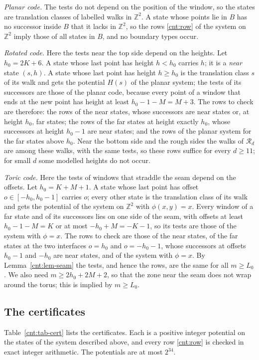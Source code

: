 \documentclass[11pt]{amsart}
\theoremstyle{definition}
\theoremstyle{remark}
\numberwithin{equation}{section}
\begin{document}
\emph{Planar code.} The tests do not depend on the position of the window, so the states are translation classes of
labelled walks in $\mathbb Z^2$. A state whose points lie in $B$ has no successor inside $B$ that it lacks in
$\mathbb Z^2$, so the rows \eqref{cnt:row} of the system on $\mathbb Z^2$ imply those of all states in $B$, and no
boundary types occur.

\emph{Rotated code.} Here the tests near the top side depend on the heights. Let $h_0=2K+6$. A state whose last point
has height $h<h_0$ carries $h$; it is a \emph{near} state $(s,h)$. A state whose last point has height $h\ge h_0$ is the
translation class $s$ of its walk and gets the potential $H(s)$ of the planar system; the tests of its successors are
those of the planar code, because every point of a window that ends at the new point has height at least
$h_0-1-M=M+3$. The rows to check are therefore: the rows of the near states, whose successors are near states or, at
height $h_0$, far states; the rows of the far states at height exactly $h_0$, whose successors at height $h_0-1$ are
near states; and the rows of the planar system for the far states above $h_0$. Near the bottom side and the rough
sides the walks of $\mathcal R_d$ are among these walks, with the same tests, so these rows suffice for every
$d\ge11$; for small $d$ some modelled heights do not occur.

\emph{Toric code.} Here the tests of windows that straddle the seam depend on the offsets. Let $h_0=K+M+1$. A state
whose last point has offset $o\in[-h_0,h_0-1]$ carries $o$; every other state is the translation class of its walk and
gets the potential of the system on $\mathbb Z^2$ with $\phi(x,y)=x$. Every window of a far state and of its successors
lies on one side of the seam, with offsets at least $h_0-1-M=K$ or at most $-h_0+M=-K-1$, so its tests are those of
the system with $\phi=x$. The rows to check are those of the near states, of the far states at the two interfaces
$o=h_0$ and $o=-h_0-1$, whose successors at offsets $h_0-1$ and $-h_0$ are near states, and of the system with
$\phi=x$. By Lemma~\ref{cnt:lem-seam} the tests, and hence the rows, are the same for all $m\ge L_0$. We also need
$m\ge 2h_0+2M+2$, so that the zone near the seam does not wrap around the torus; this is implied by $m\ge L_0$.

\subsection{The certificates}\label{cnt:cert}
Table~\ref{cnt:tab-cert} lists the certificates. Each is a positive integer potential on the states of the system
described above, and every row \eqref{cnt:row} is checked in exact integer arithmetic. The potentials are at most
$2^{34}$.
\end{document}
